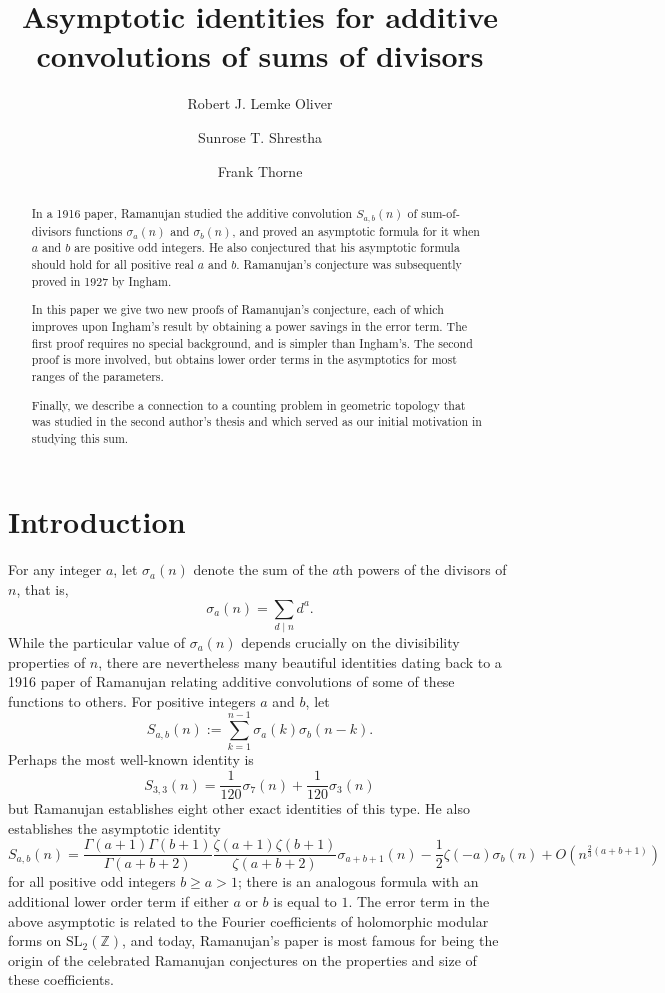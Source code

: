 \documentclass[12pt]{amsart}
\title{Asymptotic identities for additive convolutions of sums of divisors}
\author{Robert J. Lemke Oliver}
\author{Sunrose T. Shrestha}
\author{Frank Thorne}
\numberwithin{equation}{section}
\numberwithin{theorem}{section}
\begin{document}
\begin{abstract}
In a 1916 paper, Ramanujan studied the additive convolution $S_{a, b}(n)$ of sum-of-divisors functions $\sigma_a(n)$ and $\sigma_b(n)$, and proved an asymptotic
formula for it when $a$ and $b$ are positive odd integers. He also conjectured that his asymptotic formula should hold for all positive 
real $a$ and $b$. Ramanujan's conjecture was subsequently proved in 1927 by Ingham.

In this paper we give two new proofs of Ramanujan's conjecture, each of which improves upon Ingham's result by obtaining 
a power savings in the error term. The first proof requires no special background, and is simpler than Ingham's. The second
proof is more involved, but obtains lower order terms in the asymptotics for most ranges of the parameters.

Finally, we describe a connection to a counting problem in geometric topology that was studied in the second author's thesis and which
served as our initial motivation in studying this sum.

\end{abstract}

\maketitle

\section{Introduction}

For any integer $a$, let $\sigma_a(n)$ denote the sum of the $a$th powers of the divisors of $n$, that is,
\[
\sigma_a(n) = \sum_{d\mid n} d^a.
\]
While the particular value of $\sigma_a(n)$ depends crucially on the divisibility properties of $n$, there are nevertheless many beautiful identities dating back to a 1916 paper of Ramanujan \cite{Ramanujan} relating additive convolutions of some of these functions to others.  For positive integers $a$ and $b$, let
\[
S_{a,b}(n) := \sum_{k=1}^{n-1} \sigma_a(k) \sigma_b(n-k).
\]
Perhaps the most well-known identity is
\[
S_{3,3}(n) = \frac{1}{120}\sigma_7(n) + \frac{1}{120}\sigma_3(n)
\]
but Ramanujan establishes eight other exact identities of this type.  He also establishes the asymptotic identity
\begin{equation} \label{eqn:ramanujan}
S_{a,b}(n) = \frac{\Gamma(a+1)\Gamma(b+1)}{\Gamma(a+b+2)} \frac{\zeta(a+1)\zeta(b+1)}{\zeta(a+b+2)} \sigma_{a+b+1}(n) - \frac{1}{2}\zeta(-a)\sigma_b(n)+ O(n^{\frac{2}{3}(a+b+1)}) 
\end{equation}
for all positive odd integers $b\geq a>1$; there is an analogous formula with an additional lower order term if either $a$ or $b$ is equal to $1$.  The error term in the above asymptotic is related to the Fourier coefficients of holomorphic modular forms on $\mathrm{SL}_2(\mathbb{Z})$, and today, Ramanujan's paper is most famous for being the origin of the celebrated Ramanujan conjectures on the properties and size of these coefficients.
\end{document}
